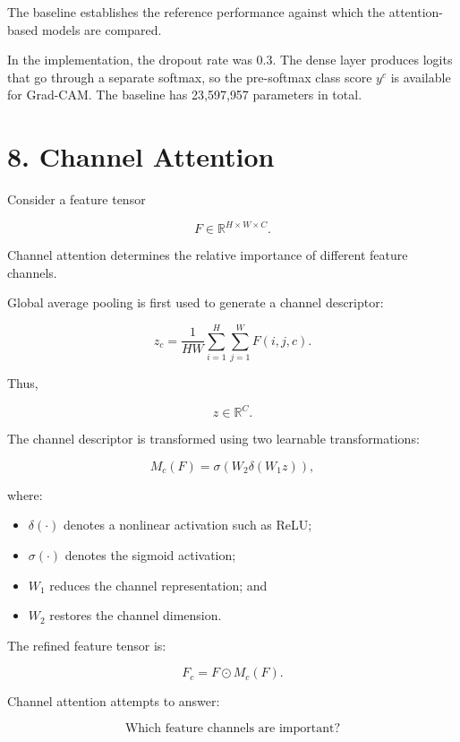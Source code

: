\documentclass[10pt]{article}
\begin{document}
The baseline establishes the reference performance against which the
attention-based models are compared.

In the implementation, the dropout rate was $0.3$. The dense layer produces
logits that go through a separate softmax, so the pre-softmax class score $y^c$
is available for Grad-CAM. The baseline has 23{,}597{,}957 parameters in total.

\section*{8. Channel Attention}

Consider a feature tensor

\[
F\in\mathbb{R}^{H\times W\times C}.
\]

Channel attention determines the relative importance of different feature
channels.

Global average pooling is first used to generate a channel descriptor:

\[
z_c
=
\frac{1}{HW}
\sum_{i=1}^{H}
\sum_{j=1}^{W}
F(i,j,c).
\]

Thus,

\[
z\in\mathbb{R}^{C}.
\]

The channel descriptor is transformed using two learnable transformations:

\[
M_c(F)
=
\sigma
\left(
W_2
\delta
\left(
W_1z
\right)
\right),
\]

where:

\begin{itemize}

\item $\delta(\cdot)$ denotes a nonlinear activation such as ReLU;

\item $\sigma(\cdot)$ denotes the sigmoid activation;

\item $W_1$ reduces the channel representation; and

\item $W_2$ restores the channel dimension.

\end{itemize}

The refined feature tensor is:

\[
F_c
=
F\odot M_c(F).
\]

Channel attention attempts to answer:

\[
\boxed{\text{Which feature channels are important?}}
\]
\end{document}
